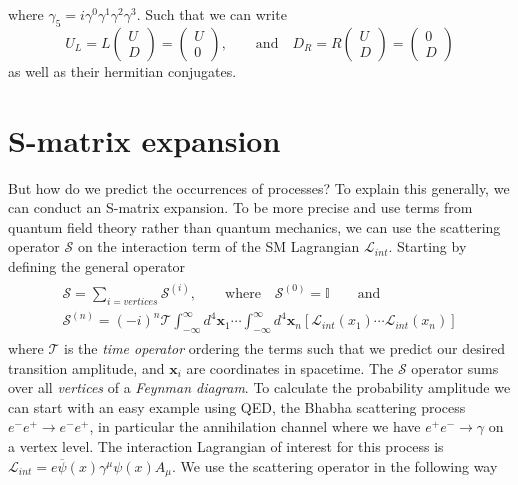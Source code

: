 \documentclass[12pt, a4paper]{book}
\begin{document}
where $\gamma_{5}=i\gamma^0\gamma^1\gamma^2\gamma^3$. Such that we can write 
$$
U_L = L\begin{pmatrix}
    U\\D
\end{pmatrix} = \begin{pmatrix}
    U\\0
\end{pmatrix},\qquad\text{and}\quad D_R = R\begin{pmatrix}
    U\\D
\end{pmatrix} = \begin{pmatrix}
    0\\D
\end{pmatrix}
$$
as well as their hermitian conjugates. 


\section{S-matrix expansion}
But how do we predict the occurrences of processes? To explain this generally, we can conduct an S-matrix expansion. To be more precise and use terms from quantum field theory rather than quantum mechanics, we can use the scattering operator $\mathcal{S}$ on the interaction 
term of the SM Lagrangian $\mathcal{L}_{int}$. Starting by defining the general operator
\begin{align}\label{eq:S-matrix}
    \begin{split}
        \mathcal{S} = \sum_{i = vertices}\mathcal{S}^{(i)},\qquad\text{where}\quad \mathcal{S}^{(0)} = \mathbb{I}\qquad\text{and}\quad \\
        \mathcal{S}^{(n)}=(-i)^n\mathcal{T}\int_{-\infty}^{\infty}d^4\mathbf{x}_1\cdots\int_{-\infty}^{\infty}d^4\mathbf{x}_n\left[\mathcal{L}_{int}(x_1)\cdots\mathcal{L}_{int}(x_n)\right]
    \end{split}
\end{align}
where $\mathcal{T}$ is the \textit{time operator} ordering the terms such that we predict our desired transition amplitude, and $\mathbf{x}_i$ are coordinates in spacetime.  The $\mathcal{S}$ operator sums over all \textit{vertices} 
of a \textit{Feynman diagram}. To calculate the probability amplitude we can start with an easy example using QED, the Bhabha scattering process $e^- e^+\rightarrow e^-e^+$, in particular the annihilation channel where we have $e^+e^-\rightarrow\gamma$ on a vertex level. The interaction Lagrangian of interest for this process is
$\mathcal{L}_{int} = e\overline{\psi}(x)\gamma^\mu\psi(x)A_\mu$. We use the scattering operator in the following way
\end{document}
